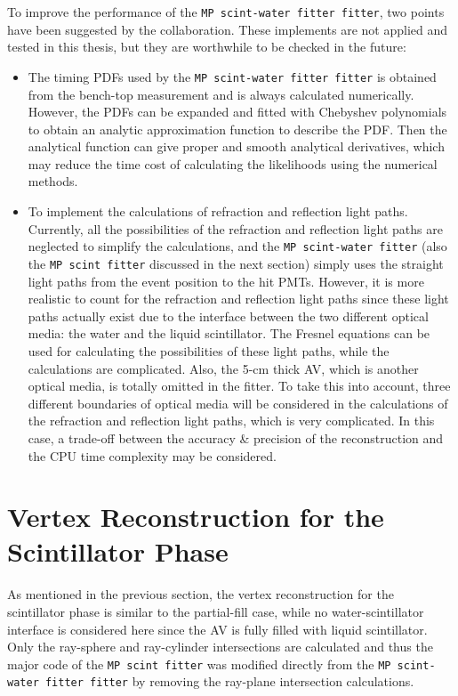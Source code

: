To improve the performance of the \texttt{MP scint-water fitter fitter}, two points have been suggested by the collaboration. These implements are not applied and tested in this thesis, but they are worthwhile to be checked in the future:
\begin{itemize}
	\item The timing PDFs used by the \texttt{MP scint-water fitter fitter} is obtained from the bench-top measurement and is always calculated numerically. However, the PDFs can be expanded and fitted with Chebyshev polynomials to obtain an analytic approximation function to describe the PDF\cite{press2007numerical}. Then the analytical function can give proper and smooth analytical derivatives, which may reduce the time cost of calculating the likelihoods using the numerical methods.	
	\item To implement the calculations of refraction and reflection light paths. Currently, all the possibilities of the refraction and reflection light paths are neglected to simplify the calculations, and the \texttt{MP scint-water fitter} (also the \texttt{MP scint fitter} discussed in the next section) simply uses the straight light paths from the event position to the hit PMTs. However, it is more realistic to count for the refraction and reflection light paths since these light paths actually exist due to the interface between the two different optical media: the water and the liquid scintillator. The Fresnel equations can be used for calculating the possibilities of these light paths\cite{partialWater}, while the calculations are complicated. Also, the 5-cm thick AV, which is another optical media, is totally omitted in the fitter. To take this into account, three different boundaries of optical media will be considered in the calculations of the refraction and reflection light paths, which is very complicated. In this case, a trade-off between the accuracy \& precision of the reconstruction and the CPU time complexity may be considered.
\end{itemize}

\section{Vertex Reconstruction for the Scintillator Phase}\label{sect:scintFitter}
As mentioned in the previous section, the vertex reconstruction for the scintillator phase is similar to the partial-fill case, while no water-scintillator interface is considered here since the AV is fully filled with liquid scintillator. Only the ray-sphere and ray-cylinder intersections are calculated and thus the major code of the \texttt{MP scint fitter} was modified directly from the \texttt{MP scint-water fitter fitter} by removing the ray-plane intersection calculations.

